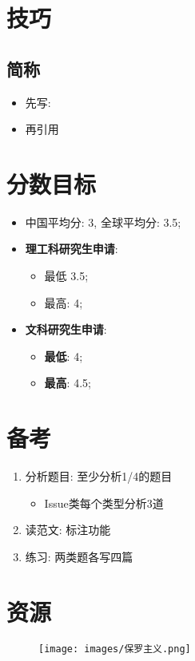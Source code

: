 \section{技巧}

  \subsection{简称}

    \begin{itemize}
      \item 先写: 
      \item 再引用 
    \end{itemize}

\section{分数目标}

  \begin{itemize}
    \item 中国平均分: 3, 全球平均分: 3.5;
    \item \textbf{理工科研究生申请}:
    \begin{itemize}
      \item 最低 3.5;
      \item 最高: 4;
    \end{itemize}

    \item \textbf{文科研究生申请}:
    \begin{itemize}
      \item \textbf{最低}: 4;
      \item \textbf{最高}: 4.5;
    \end{itemize}
  \end{itemize}

\section{备考}

  \begin{enumerate}
    \item 分析题目: 至少分析1/4的题目
    \begin{itemize}
      \item Issue类每个类型分析3道
    \end{itemize}

    \item 读范文: 标注功能
    \item 练习: 两类题各写四篇
  \end{enumerate}

\section{资源}

  \begin{figure}[H]
    \centering
    \texttt{[image: images/保罗主义.png]}
  \end{figure}
